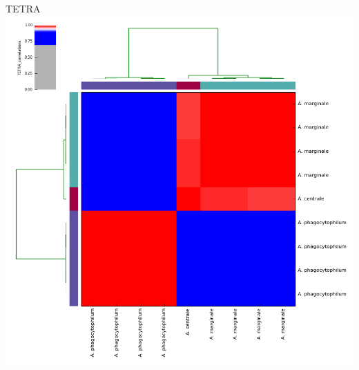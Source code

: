 \begin{frame}
\begin{columns}
      TETRA \\
      \includegraphics[width=\textwidth]{images/TETRA_correlations}    
  \end{columns} 
\end{frame}

